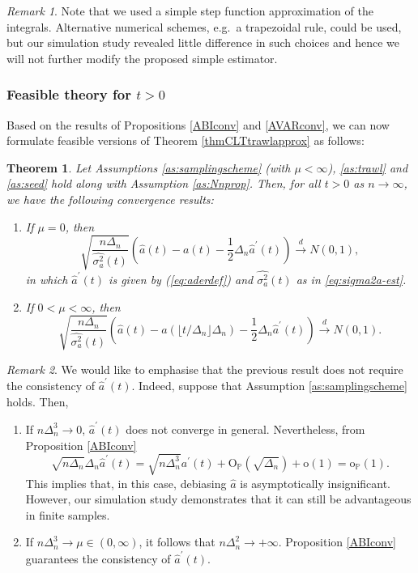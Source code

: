 \documentclass{article}
\theoremstyle{plain}
\newtheorem{theorem}{Theorem}
\theoremstyle{definition}
\theoremstyle{remark}
\newtheorem{remark}{Remark}[section]
\begin{document}
\begin{remark}
	Note that we used a simple step function approximation of the integrals. Alternative numerical schemes, e.g.~a trapezoidal rule, could be used, but our simulation study revealed little difference in such choices and hence we will not further modify the proposed simple estimator.
\end{remark}
\subsubsection{Feasible theory for $t>0$}
Based on the results of Propositions \ref{ABIconv} and \ref{AVARconv}, we can now formulate feasible versions of Theorem \ref{thmCLTtrawlapprox}
as follows:

\begin{theorem}\label{thm:CLTfeasible} Let Assumptions \ref{as:samplingscheme} (with $\mu<\infty$),
	\ref{as:trawl} and \ref{as:seed} hold along with Assumption \ref{as:Nnprop}. Then, for all
	$t>0$ as $n\rightarrow\infty$, we have the following convergence results:
	\begin{enumerate}
		\item If $\mu=0$, then
		\[
		\sqrt{\frac{n\Delta_{n}}{\widehat{\sigma_{a}^{2}}(t)}}\left(\hat{a}(t)-a(t)-\frac{1}{2}\Delta_{n}\hat{a}^{\prime}(t)\right)\overset{d}{\rightarrow}N(0,1),
		\]
		in which $\hat{a}^{\prime}(t)$ is given by (\ref{eq:aderdef}) and $\widehat{\sigma_{a}^{2}}(t)$ as in \eqref{eq:sigma2a-est}.
		\item If $0<\mu<\infty$, then 
		\[
		\sqrt{\frac{n\Delta_{n}}{\widehat{\sigma_{a}^{2}}(t)}}\left(\hat{a}(t)-a(\lfloor t/\Delta_{n}\rfloor\Delta_{n})-\frac{1}{2}\Delta_{n}\hat{a}^{\prime}(t)\right)\overset{d}{\rightarrow}N(0,1).
		\]
	\end{enumerate}
\end{theorem}

\begin{remark}
 We would like to emphasise that the previous result does not require the consistency of $\hat{a}^{\prime}(t)$. Indeed, suppose that Assumption \ref{as:samplingscheme} holds. Then,
\begin{enumerate}
   \item If $n\Delta_{n}^{3}\rightarrow0$, $\hat{a}^{\prime}(t)$ does not converge in general. Nevertheless, from Proposition \ref{ABIconv}
\[\sqrt{n\Delta_{n}}\Delta_{n}\hat{a}^{\prime}(t)=\sqrt{n\Delta_{n}^{3}}a^{\prime}(t)+\mathrm{O}_{\mathbb{P}}(\sqrt{\Delta_{n}})+\mathrm{o}(1)=\mathrm{o}_{\mathbb{P}}(1).\]
This implies that, in this case, debiasing $\hat{a}$ is asymptotically insignificant. However, our simulation study demonstrates that it can still be advantageous in finite samples.
\item If $n\Delta_{n}^{3}\rightarrow\mu\in(0,\infty)$, it follows that $n\Delta_{n}^{2}\rightarrow+\infty$. Proposition \ref{ABIconv} guarantees the consistency of $\hat{a}^{\prime}(t)$.
\end{enumerate}

\end{remark}
\end{document}
